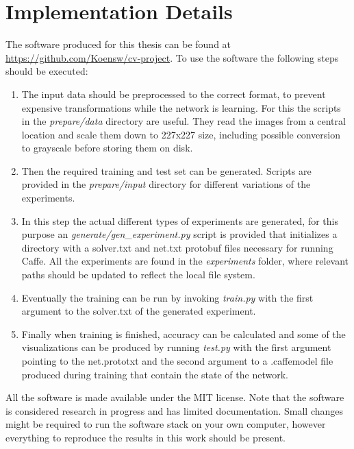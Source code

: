 %
\chapter{Implementation Details}
\label{app:implementation_details}

The software produced for this thesis can be found at \url{https://github.com/Koensw/cv-project}. To use the software the following steps should be executed:
\begin{enumerate}
\item The input data should be preprocessed to the correct format, to prevent expensive transformations while the network is learning. For this the scripts in the \textit{prepare/data} directory are useful. They read the images from a central location and scale them down to 227x227 size, including possible conversion to grayscale before storing them on disk.
\item Then the required training and test set can be generated. Scripts are provided in the \textit{prepare/input} directory for different variations of the experiments.
\item In this step the actual different types of experiments are generated, for this purpose an \textit{generate/gen\_experiment.py} script is provided that initializes a directory with a solver.txt and net.txt protobuf files necessary for running Caffe. All the experiments are found in the \textit{experiments} folder, where relevant paths should be updated to reflect the local file system.
\item Eventually the training can be run by invoking \textit{train.py} with the first argument to the solver.txt of the generated experiment. 
\item Finally when training is finished, accuracy can be calculated and some of the visualizations can be produced by running \textit{test.py} with the first argument pointing to the net.prototxt and the second argument to a .caffemodel file produced during training that contain the state of the network.
\end{enumerate}
All the software is made available under the MIT license. Note that the software is considered research in progress and has limited documentation. Small changes might be required to run the software stack on your own computer, however everything to reproduce the results in this work should be present.

